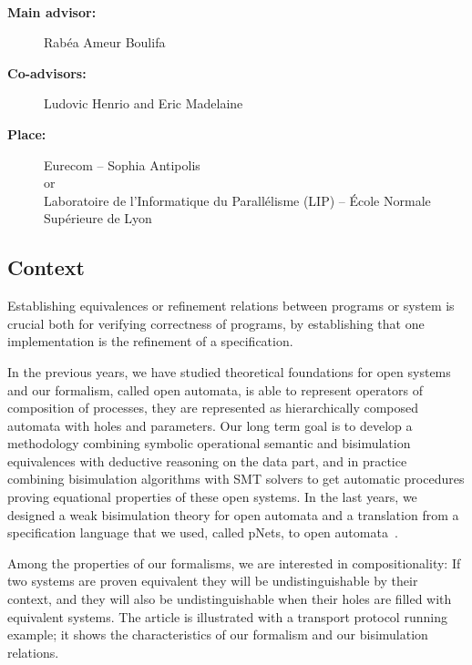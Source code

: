 \documentclass[11pt,fleqn]{article}
\begin{document}
\begin{center}
\\\bigskip
{}
\end{center}
\medskip

\begin{description}
\item[\bf Main advisor:] Rabéa Ameur Boulifa 
\item[\bf Co-advisors:] Ludovic Henrio and Eric Madelaine
\item[\bf Place:] Eurecom  -- Sophia Antipolis
\\
or\\
Laboratoire de l'Informatique du Parallélisme (LIP) --
  \'Ecole Normale Supérieure de Lyon
\end{description}

\subsection*{Context}


Establishing equivalences or refinement relations between programs or system is crucial both for verifying correctness of programs, by establishing that one implementation is the refinement of a specification. 

In the previous years, we have studied theoretical foundations for open
systems and our formalism, called open automata, is able to represent operators of composition of processes, 
they are represented
as hierarchically composed automata with holes and parameters. 
Our long 
term goal is to 
develop a methodology combining symbolic operational semantic and bisimulation 
equivalences with deductive reasoning on the data part, 
and in practice combining bisimulation algorithms with SMT solvers to get automatic 
procedures proving equational properties
of these open systems. In the last years, we designed a weak bisimulation theory for  open automata and a translation from a specification language that we used, called pNets, to open automata~\cite{arxiv-weakbisim,henrio:Forte2016,hou:hal-02406098}.


Among the properties of our formalisms, we are interested in compositionality: If two systems are proven equivalent they will be undistinguishable by their context, and they will also be undistinguishable when their holes are filled with equivalent systems.
The article is illustrated with a transport protocol running example; it shows the characteristics of our formalism and our bisimulation relations.
\end{document}
